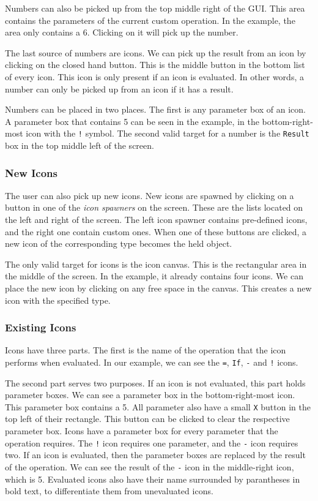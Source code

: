 \documentclass{report}
\begin{document}
Numbers can also be picked up from the top middle right of the GUI. This area contains the parameters of the current custom operation.
In the example, the area only contains a 6. Clicking on it will pick up the number.

The last source of numbers are icons. We can pick up the result from an icon by clicking on the closed hand button.
This is the middle button in the bottom list of every icon. This icon is only present if an icon is evaluated.
In other words, a number can only be picked up from an icon if it has a result.

Numbers can be placed in two places. The first is any parameter box of an icon. A parameter box that contains 5 can be seen in the example, in the bottom-right-most icon with the \texttt{!} symbol.
The second valid target for a number is the \texttt{Result} box in the top middle left of the screen.

\subsubsection{New Icons}
The user can also pick up new icons. New icons are spawned by clicking on a button in one of the \emph{icon spawners} on the screen.
These are the lists located on the left and right of the screen. The left icon spawner contains pre-defined icons, and the right one contain custom ones.
When one of these buttons are clicked, a new icon of the corresponding type becomes the held object.

The only valid target for icons is the icon canvas. This is the rectangular area in the middle of the screen. In the example, it already contains four icons.
We can place the new icon by clicking on any free space in the canvas. This creates a new icon with the specified type.

\subsubsection{Existing Icons}
Icons have three parts. The first is the name of the operation that the icon performs when evaluated. In our example, we can see the \texttt{=}, \texttt{If}, \texttt{-} and \texttt{!} icons.

The second part serves two purposes.
If an icon is not evaluated, this part holds parameter boxes. We can see a parameter box in the bottom-right-most icon. This parameter box contains a 5.
All parameter also have a small \texttt{X} button in the top left of their rectangle. This button can be clicked to clear the respective parameter box.
Icons have a parameter box for every parameter that the operation requires. The \texttt{!} icon requires one parameter, and the \texttt{-} icon requires two.
If an icon is evaluated, then the parameter boxes are replaced by the result of the operation. We can see the result of the \texttt{-} icon in the middle-right icon, which is 5.
Evaluated icons also have their name surrounded by parantheses in bold text, to differentiate them from unevaluated icons.
\end{document}
